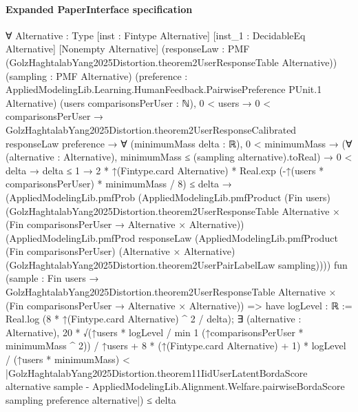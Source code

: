 \documentclass[10pt]{article}
\begin{document}
\paragraph{Expanded PaperInterface specification}
\begin{ReviewVerbatim}
∀ {Alternative : Type} [inst : Fintype Alternative] [inst_1 : DecidableEq Alternative] [Nonempty Alternative]
  (responseLaw : PMF (GolzHaghtalabYang2025Distortion.theorem2UserResponseTable Alternative))
  (sampling : PMF Alternative)
  (preference : AppliedModelingLib.Learning.HumanFeedback.PairwisePreference PUnit.{1} Alternative)
  (users comparisonsPerUser : ℕ),
  0 < users →
    0 < comparisonsPerUser →
      GolzHaghtalabYang2025Distortion.theorem2UserResponseCalibrated responseLaw preference →
        ∀ (minimumMass delta : ℝ),
          0 < minimumMass →
            (∀ (alternative : Alternative), minimumMass ≤ (sampling alternative).toReal) →
              0 < delta →
                delta ≤ 1 →
                  2 * ↑(Fintype.card Alternative) * Real.exp (-↑(users * comparisonsPerUser) * minimumMass / 8) ≤
                      delta →
                    (AppliedModelingLib.pmfProb
                        (AppliedModelingLib.pmfProduct (Fin users)
                          (GolzHaghtalabYang2025Distortion.theorem2UserResponseTable Alternative ×
                            (Fin comparisonsPerUser → Alternative × Alternative))
                          (AppliedModelingLib.pmfProd responseLaw
                            (AppliedModelingLib.pmfProduct (Fin comparisonsPerUser) (Alternative × Alternative)
                              (GolzHaghtalabYang2025Distortion.theorem2UserPairLabelLaw sampling))))
                        fun
                          (sample :
                            Fin users →
                              GolzHaghtalabYang2025Distortion.theorem2UserResponseTable Alternative ×
                                (Fin comparisonsPerUser → Alternative × Alternative)) =>
                        have logLevel : ℝ := Real.log (8 * ↑(Fintype.card Alternative) ^ 2 / delta);
                        ∃ (alternative : Alternative),
                          20 * √(↑users * logLevel / min 1 (↑comparisonsPerUser * minimumMass ^ 2)) / ↑users +
                              8 * (↑(Fintype.card Alternative) + 1) * logLevel / (↑users * minimumMass) <
                            |GolzHaghtalabYang2025Distortion.theorem11IidUserLatentBordaScore alternative sample -
                                AppliedModelingLib.Alignment.Welfare.pairwiseBordaScore sampling preference
                                  alternative|) ≤
                      delta
\end{ReviewVerbatim}
\end{document}
